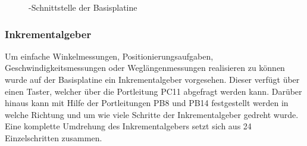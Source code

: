 \begin{figure}[H]
    \centering
    \qquad
    \qquad
    \caption[\IIC{}-Schnittstelle der Basisplatine]{\IIC{}-Schnittstelle der \gls{Basisplatine}}
    \label{fig:basisplatine-iic}
\end{figure}

\subsubsection{Inkrementalgeber}
Um einfache Winkelmessungen, Positionierungsaufgaben, Geschwindigkeitsmessungen oder Weglängenmessungen realisieren zu können wurde auf der \gls{Basisplatine} ein Inkrementalgeber vorgesehen. Dieser verfügt über einen Taster, welcher über die Portleitung PC11 abgefragt werden kann. Darüber hinaus kann mit Hilfe der Portleitungen PB8 und PB14 festgestellt werden in welche Richtung und um wie viele Schritte der Inkrementalgeber gedreht wurde. Eine komplette Umdrehung des Inkrementalgebers setzt sich aus 24 Einzelschritten zusammen.

